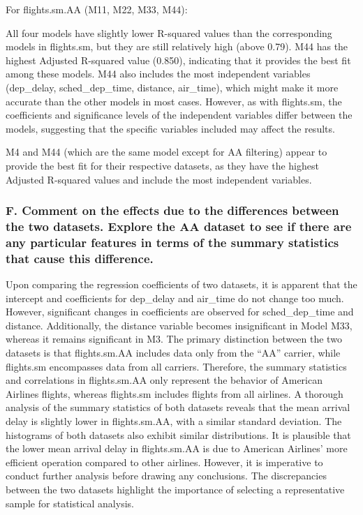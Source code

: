 \documentclass[
]{article}
\begin{document}
For flights.sm.AA (M11, M22, M33, M44):

All four models have slightly lower R-squared values than the
corresponding models in flights.sm, but they are still relatively high
(above 0.79). M44 has the highest Adjusted R-squared value (0.850),
indicating that it provides the best fit among these models. M44 also
includes the most independent variables (dep\_delay, sched\_dep\_time,
distance, air\_time), which might make it more accurate than the other
models in most cases. However, as with flights.sm, the coefficients and
significance levels of the independent variables differ between the
models, suggesting that the specific variables included may affect the
results.

M4 and M44 (which are the same model except for AA filtering) appear to
provide the best fit for their respective datasets, as they have the
highest Adjusted R-squared values and include the most independent
variables.

\hypertarget{f.-comment-on-the-effects-due-to-the-differences-between-the-two-datasets.-explore-the-aa-dataset-to-see-if-there-are-any-particular-features-in-terms-of-the-summary-statistics-that-cause-this-difference.}{%
\subsubsection{F. Comment on the effects due to the differences between
the two datasets. Explore the AA dataset to see if there are any
particular features in terms of the summary statistics that cause this
difference.}\label{f.-comment-on-the-effects-due-to-the-differences-between-the-two-datasets.-explore-the-aa-dataset-to-see-if-there-are-any-particular-features-in-terms-of-the-summary-statistics-that-cause-this-difference.}}

Upon comparing the regression coefficients of two datasets, it is
apparent that the intercept and coefficients for dep\_delay and
air\_time do not change too much. However, significant changes in
coefficients are observed for sched\_dep\_time and distance.
Additionally, the distance variable becomes insignificant in Model M33,
whereas it remains significant in M3. The primary distinction between
the two datasets is that flights.sm.AA includes data only from the
``AA'' carrier, while flights.sm encompasses data from all carriers.
Therefore, the summary statistics and correlations in flights.sm.AA only
represent the behavior of American Airlines flights, whereas flights.sm
includes flights from all airlines. A thorough analysis of the summary
statistics of both datasets reveals that the mean arrival delay is
slightly lower in flights.sm.AA, with a similar standard deviation. The
histograms of both datasets also exhibit similar distributions. It is
plausible that the lower mean arrival delay in flights.sm.AA is due to
American Airlines' more efficient operation compared to other airlines.
However, it is imperative to conduct further analysis before drawing any
conclusions. The discrepancies between the two datasets highlight the
importance of selecting a representative sample for statistical
analysis.
\end{document}
